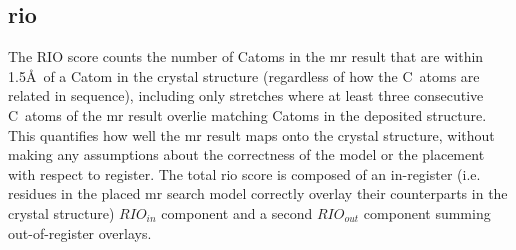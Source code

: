 \subsection{\acrlong{rio}} \label{sec:methods_rio}
The RIO score counts the number of C\textalpha atoms in the \gls{mr} result that are within 1.5\AA\ of a C\textalpha atom in the crystal structure (regardless of how the C\textalpha\ atoms are related in sequence), including only stretches where at least three consecutive C\textalpha\ atoms of the \gls{mr} result overlie matching C\textalpha atoms in the deposited structure. This quantifies how well the \gls{mr} result maps onto the crystal structure, without making any assumptions about the correctness of the model or the placement with respect to register. The total \gls{rio} score is composed of an in-register (i.e. residues in the placed \gls{mr} search model correctly overlay their counterparts in the crystal structure) $RIO_{in}$ component and a second $RIO_{out}$ component summing out-of-register overlays.

